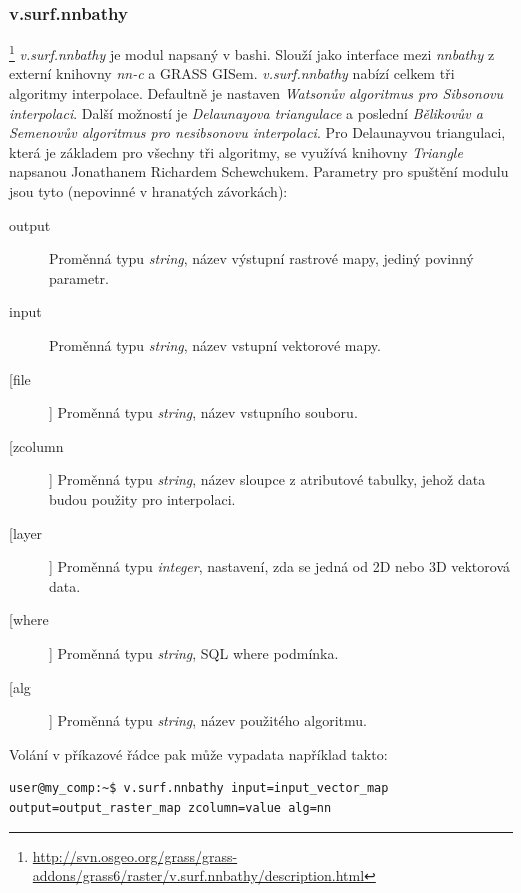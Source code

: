 \documentclass[12pt,a4paper]{article}
\begin{document}
\subsubsection{v.surf.nnbathy}\footnote{\url{http://svn.osgeo.org/grass/grass-addons/grass6/raster/v.surf.nnbathy/description.html}}
\emph{v.surf.nnbathy} je modul napsaný v bashi. Slouží jako interface mezi \emph{nnbathy} z externí knihovny \emph{nn-c} a GRASS GISem. \emph{v.surf.nnbathy} nabízí celkem tři algoritmy interpolace. Defaultně je nastaven \emph{Watsonův algoritmus 	pro Sibsonovu interpolaci}. Další možností je \emph{Delaunayova triangulace} a poslední \emph{Bělikovův a Semenovův algoritmus pro nesibsonovu interpolaci}. Pro Delaunayvou triangulaci, která je základem pro všechny tři algoritmy, se využívá knihovny \emph{Triangle} napsanou Jonathanem Richardem Schewchukem. Parametry pro spuštění modulu jsou tyto (nepovinné v hranatých závorkách):
\begin{description}
\item[output] Proměnná typu \emph{string}, název výstupní rastrové mapy, jediný povinný parametr.
\item[input] Proměnná typu \emph{string}, název vstupní vektorové mapy.
\item[[file]] Proměnná typu \emph{string}, název vstupního souboru.
\item[[zcolumn]] Proměnná typu \emph{string}, název sloupce z atributové tabulky, jehož data budou použity pro interpolaci.
\item[[layer]] Proměnná typu \emph{integer}, nastavení, zda se jedná od 2D nebo 3D vektorová data.
\item[[where]] Proměnná typu \emph{string}, SQL where podmínka.
\item[[alg]] Proměnná typu \emph{string}, název použitého algoritmu.
\end{description}

\bigskip

Volání v příkazové řádce pak může vypadata například takto:
\begin{lstlisting}[caption={bash version}]
user@my_comp:~$ v.surf.nnbathy input=input_vector_map output=output_raster_map zcolumn=value alg=nn
\end{lstlisting}
\end{document}
